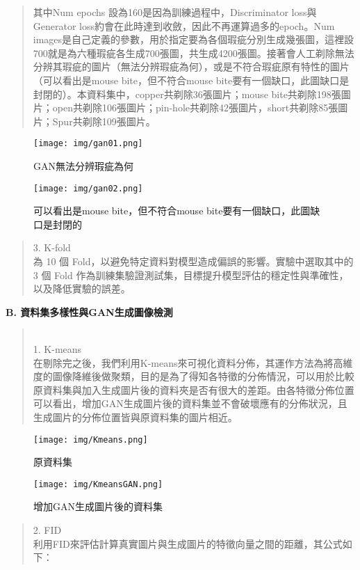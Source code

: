 \begin{flushleft}
\begin{abstract}
  其中Num epochs 設為160是因為訓練過程中，Discriminator loss與Generator loss約會在此時達到收斂，因此不再運算過多的epoch。Num images是自己定義的參數，用於指定要為各個瑕疵分別生成幾張圖，這裡設700就是為六種瑕疵各生成700張圖，共生成4200張圖。接著會人工剃除無法分辨其瑕疵的圖片（無法分辨瑕疵為何），或是不符合瑕疵原有特性的圖片（可以看出是mouse bite，但不符合mouse bite要有一個缺口，此圖缺口是封閉的）。本資料集中，copper共剃除36張圖片；mouse bite共剃除198張圖片；open共剃除106張圖片；pin-hole共剃除42張圖片，short共剃除85張圖片；Spur共剃除109張圖片。
  \end{abstract}
  \begin{figure}[htbp]
    \centering 
    \texttt{[image: img/gan01.png]} 
    \caption{GAN無法分辨瑕疵為何}
    \texttt{[image: img/gan02.png]}
    \caption{可以看出是mouse bite，但不符合mouse bite要有一個缺口，此圖缺口是封閉的}
  \end{figure}
  \begin{abstract}
    3. K-fold
    \\\hspace{2em}
    為 10 個 Fold，以避免特定資料對模型造成偏誤的影響。實驗中選取其中的 3 個 Fold 作為訓練集驗證測試集，目標提升模型評估的穩定性與準確性，以及降低實驗的誤差。
  \end{abstract}
  {\fontsize{12}{0} \bf B. 資料集多樣性與GAN生成圖像檢測}
  \begin{abstract}
    \\1. K-means
    \\\hspace{2em}
    在剔除完之後，我們利用K-means來可視化資料分佈，其運作方法為將高維度的圖像降維後做聚類，目的是為了得知各特徵的分佈情況，可以用於比較原資料集與加入生成圖片後的資料夾是否有很大的差距。由各特徵分佈位置可以看出，增加GAN生成圖片後的資料集並不會破壞應有的分佈狀況，且生成圖片的分佈位置皆與原資料集的圖片相近。
  \end{abstract}
  \begin{figure}[htbp]
    \centering
    \texttt{[image: img/Kmeans.png]} 
    \caption{原資料集}
    \texttt{[image: img/KmeansGAN.png]}
    \caption{增加GAN生成圖片後的資料集}
  \end{figure}
  \begin{abstract}
    2. FID
    \\\hspace{2em}
    利用FID來評估計算真實圖片與生成圖片的特徵向量之間的距離，其公式如下：

\end{abstract}
\end{flushleft}
